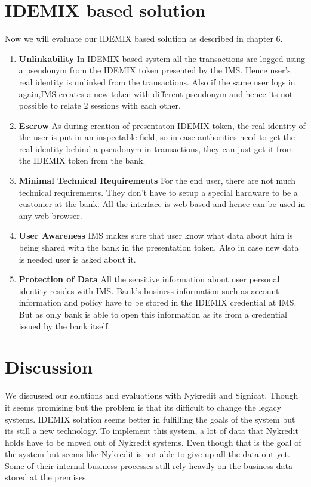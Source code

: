 \section{IDEMIX based solution}
Now we will evaluate our IDEMIX based solution as described in chapter 6. 
\begin{enumerate}
	\item{\textbf{Unlinkability}}
	In IDEMIX based system all the transactions are logged using a pseudonym from the IDEMIX token presented by the IMS. Hence user's real identity is unlinked from the transactions. Also if the same user logs in again,IMS creates a new token with different pseudonym and hence its not possible to relate 2 sessions with each other.
	\item{\textbf{Escrow}}
	As during creation of presentaton IDEMIX token, the real identity of the user is put in an inspectable field, so in case authorities need to get the real identity behind a pseudonym in transactions, they can just get it from the IDEMIX token from the bank.
	\item{\textbf{Minimal Technical Requirements}}
	For the end user, there are not much technical requirements. They don't have to setup a special hardware to be a customer at the bank. All the interface is web based and hence can be used in any web browser. 
	\item{\textbf{User Awareness}}
	IMS makes sure that user know what data about him is being shared with the bank in the presentation token. Also in case new data is needed user is asked about it.
	\item{\textbf{Protection of Data}}
	All the sensitive information about user personal identity resides with IMS. Bank's business information such as account information and policy have to be stored in the IDEMIX credential at IMS. But as only bank is able to open this information as its from a credential issued by the bank itself.
\end{enumerate}
\section{Discussion}
We discussed our solutions and evaluations with Nykredit and Signicat. Though it seems promising but the problem is that its difficult to change the legacy systems. IDEMIX solution seems better in fulfilling the goals of the system but its still a new technology. To implement this system, a lot of data that Nykredit holds have to be moved out of Nykredit systems. Even though that is the goal of the system but seems like Nykredit is not able to give up all the data out yet. Some of their internal business processes still rely heavily on the business data stored at the premises. 

